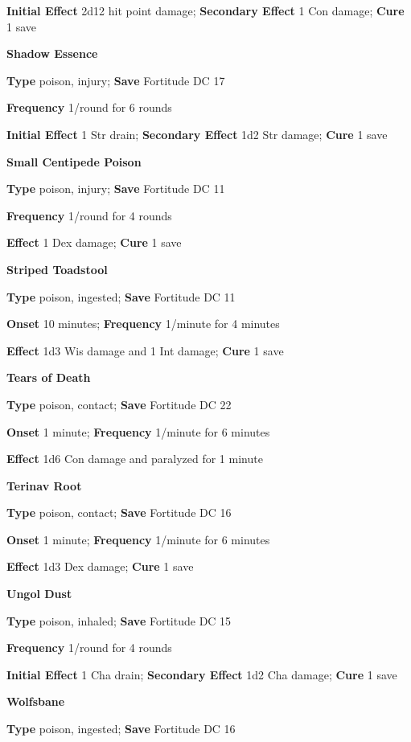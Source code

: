 \textbf{Initial Effect }2d12 hit point damage; \textbf{Secondary Effect} 1 Con damage;\textbf{ Cure} 1 save
				
\textbf{Shadow Essence }
				
\textbf{Type} poison, injury; \textbf{Save} Fortitude DC 17 
				
\textbf{Frequency} 1/round for 6 rounds
				
\textbf{Initial Effect }1 Str drain; \textbf{Secondary Effect }1d2 Str damage;\textbf{ Cure} 1 save
				
\textbf{Small Centipede Poison }
				
\textbf{Type} poison, injury; \textbf{Save} Fortitude DC 11 
				
\textbf{Frequency} 1/round for 4 rounds
				
\textbf{Effect }1 Dex damage;\textbf{ Cure} 1 save
				
\textbf{Striped Toadstool }
				
\textbf{Type} poison, ingested; \textbf{Save} Fortitude DC 11 
				
\textbf{Onset }10 minutes; \textbf{Frequency} 1/minute for 4 minutes
				
\textbf{Effect }1d3 Wis damage and 1 Int damage;\textbf{ Cure} 1 save
				
\textbf{Tears of Death }
				
\textbf{Type} poison, contact; \textbf{Save} Fortitude DC 22 
				
\textbf{Onset }1 minute; \textbf{Frequency} 1/minute for 6 minutes
				
\textbf{Effect }1d6 Con damage and paralyzed for 1 minute
				
\textbf{Terinav Root }
				
\textbf{Type} poison, contact; \textbf{Save} Fortitude DC 16 
				
\textbf{Onset }1 minute; \textbf{Frequency} 1/minute for 6 minutes
				
\textbf{Effect }1d3 Dex damage;\textbf{ Cure} 1 save
				
\textbf{Ungol Dust }
				
\textbf{Type} poison, inhaled; \textbf{Save} Fortitude DC 15 
				
\textbf{Frequency} 1/round for 4 rounds
				
\textbf{Initial Effect }1 Cha drain; \textbf{Secondary Effect }1d2 Cha damage;\textbf{ Cure} 1 save
				
\textbf{Wolfsbane}
				
\textbf{Type} poison, ingested; \textbf{Save} Fortitude DC 16 
				
